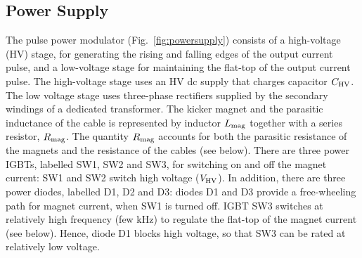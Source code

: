 \documentclass[aps,prab,twocolumn,superscriptaddress]{revtex4-1}
\begin{document}


\subsection{Power Supply}

The pulse power modulator (Fig.~\ref{fig:powersupply}) consists of a high-voltage (HV) stage, for generating the rising and falling edges of the output current pulse, and a low-voltage stage for maintaining the flat-top of the output current pulse. The high-voltage stage uses an HV dc supply that charges capacitor $C_{\rm HV}$. The low voltage stage uses three-phase rectifiers supplied by the secondary windings of a dedicated transformer. The kicker magnet and the parasitic inductance of the cable is represented by inductor $L_{\rm mag}$ together with a series resistor, $R_{\rm mag}$. The quantity $R_{\rm mag}$ accounts for both the parasitic resistance of the magnets and the resistance of the cables (see below). There are three power IGBTs, labelled SW1, SW2 and SW3, for switching on and off the magnet current: SW1 and SW2 switch high voltage ($V_{\rm HV}$). In addition, there are three power diodes, labelled D1, D2 and D3: diodes D1 and D3 provide a free-wheeling path for magnet current, when SW1 is turned off. IGBT SW3 switches at relatively high frequency (few kHz) to regulate the flat-top of the magnet current (see below). Hence, diode D1 blocks high voltage, so that SW3 can be rated at relatively low voltage.
\end{document}
